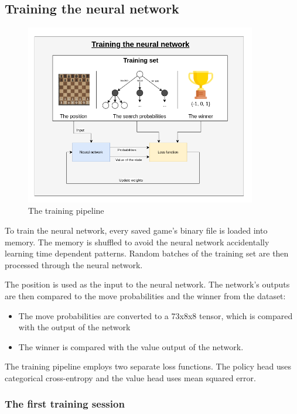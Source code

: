 \documentclass{article}
\begin{document}
\subsection{Training the neural network}

\begin{figure}[H]
    \centering
    \includegraphics[width=0.9\textwidth]{img/training.png}
    \caption{The training pipeline}
\end{figure}

To train the neural network, every saved game's binary file is loaded 
into memory. The memory is shuffled to avoid the neural network accidentally learning
time dependent patterns. Random batches of the training set are then processed through the
neural network.

The position is used as the input to the neural network. The network's outputs are then 
compared to the move probabilities and the winner from the dataset:

\begin{itemize}
    \item The move probabilities are converted to a 73x8x8 tensor, which is compared with the output of the network
    \item The winner is compared with the value output of the network.
\end{itemize}

The training pipeline employs two separate loss functions. The policy head uses categorical cross-entropy
and the value head uses mean squared error.

\subsubsection{The first training session}
\end{document}

